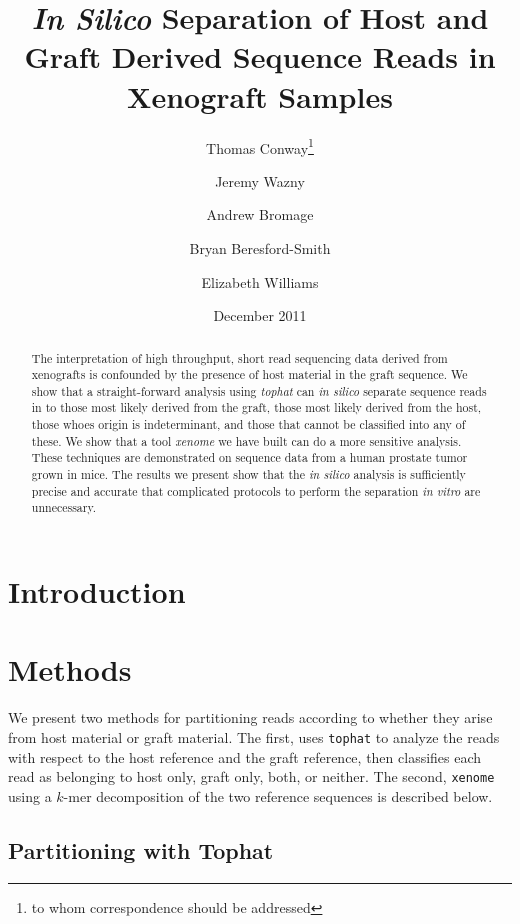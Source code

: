 \documentclass[twocolumn]{article}
\begin{document}
\title{\textit{In Silico} Separation of Host and Graft Derived Sequence Reads in Xenograft Samples}

\author{
    Thomas Conway\footnote{to whom correspondence should be addressed} \and
    Jeremy Wazny \and
    Andrew Bromage \and
    Bryan Beresford-Smith \and
    Elizabeth Williams}

\date{December 2011}

\maketitle

\begin{abstract}
The interpretation of high throughput, short read sequencing data derived from
xenografts is confounded by the presence of host material in the graft sequence.
We show that a straight-forward analysis using \textit{tophat}
can \textit{in silico} separate sequence
reads in to those most likely derived from the graft, those most likely derived from the host,
those whoes origin is indeterminant, and those that cannot be classified into any of these.
We show that a tool \textit{xenome} we have built can do a more sensitive analysis.
These techniques are demonstrated on sequence data from a human prostate tumor grown in
mice.
The results we present show that the \textit{in silico} analysis is sufficiently
precise and accurate that complicated protocols to perform the separation \textit{in vitro} 
are unnecessary.
\end{abstract}

\section{Introduction}

\section{Methods}

We present two methods for partitioning reads according to whether they
arise from host material or graft material.
The first, uses \texttt{tophat} to analyze the reads with respect to the host reference
and the graft reference, then classifies each read as belonging to host only,
graft only, both, or neither.
The second, \texttt{xenome} using a $k$-mer decomposition of the two reference sequences
is described below.

\subsection{Partitioning with Tophat}
\label{sec:tophat}
\end{document}

